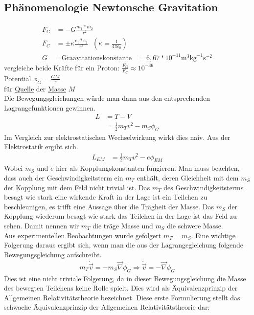 \documentclass[a4paper]{article}
\begin{document}
\subsection{Phänomenologie Newtonsche Gravitation}
\begin{align}
F_G&=-G\frac{m_1*m_2}{r^2}\\
F_C&=\pm\kappa\frac{e_1*e_2}{r^2} \ \ \ \left( \kappa=\frac{1}{4\pi\epsilon_0}
\right)\\
G&=\text{Graavitationskonstante}
&=6,67*10^{-11}\mathrm{m}^3 \mathrm{kg}^{-1} \mathrm{s}^{-2}
\end{align}
vergleiche beide Kräfte für ein Proton: $\frac{F_G}{F_C}\approx10^{-36}$\\
Potential $\phi_G=\frac{GM}{r}$\\
für \underline{Quelle} der \underline{Masse} $M$\\
Die Bewegungsgleichungen würde man dann aus den entsprechenden Lagrangefunktionen
gewinnen.
\begin{align}
L&=T-V\\
&=\frac{1}{2}m_Tv^2-m_S\phi_G
\end{align}
Im Vergleich zur elektrostatischen Wechselwirkung wirkt dies naiv. Aus der
Elektrostatik ergibt sich.
\begin{align}
L_{EM}&=\frac{1}{2}m_Tv^2-e\phi_{EM}
\end{align}
Wobei $m_S$ und $e$ hier als Kopplungskonstanten fungieren.
Man muss beachten, dass auch der Geschwindigkeitsterm ein $m_T$ enthält, deren
Gleichheit mit dem $m_S$ der Kopplung mit dem Feld nicht trivial ist. Das $m_T$
des Geschwindigkeitsterms besagt wie stark eine wirkende Kraft in der Lage ist ein
Teilchen zu beschleunigen, es trifft eine Aussage über die Trägheit der Masse.
Das $m_S$ der Kopplung wiederum besagt wie stark das Teilchen in der Lage ist
das Feld zu sehen. Damit nennen wir $m_T$ die träge Masse und $m_S$ die schwere
Masse.\\
Aus experimentellen Beobachtungen wurde gefolgert $m_T=m_S$. Eine wichtige
Folgerung daraus ergibt sich, wenn man die aus der Lagrangegleichung folgende
Bewegungsgleichung aufschreibt.
\begin{align}
m_T \dot{\vec{v}}=-m_S \vec{\nabla}\phi_G
\Rightarrow \dot{\vec{v}}=- \vec{\nabla}\phi_G
\end{align}
Dies ist eine nicht triviale Folgerung, da in dieser Bewegungsgleichung die Masse
des bewegten Teilchens keine Rolle spielt. Dies wird als Äquivalenzprinzip der
Allgemeinen Relativitätstheorie bezeichnet. Diese erste Formulierung stellt das
schwache Äquivalenzprinzip der Allgemeinen Relativitätstheorie dar:\\
\\
\end{document}
